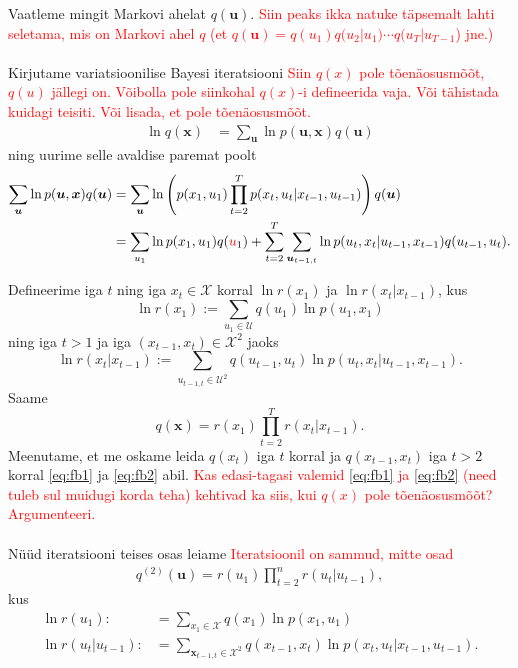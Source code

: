 Vaatleme mingit Markovi ahelat $q(\bm{u})$.
\textcolor{red}{Siin peaks ikka natuke täpsemalt lahti seletama, mis on Markovi ahel $q$ (et $q(\bm{u})=q(u_1)q(u_2|u_1)\cdots q(u_T|u_{T-1}$) jne.)}
\\\\
Kirjutame variatsioonilise Bayesi iteratsiooni \textcolor{red}{Siin $q(x)$ pole tõenäosusmõõt, $q(u)$ jällegi on. Võibolla pole siinkohal $q(x)$-i defineerida vaja. Või tähistada kuidagi teisiti. Või lisada, et pole tõenäosusmõõt.}
\begin{align*}
    \ln q(\bm{x}) &= \sum_{\bm{u}} \ln p(\bm{u},\bm{x}) q(\bm{u})
\end{align*}
ning uurime selle avaldise paremat poolt
\begin{align*}
    \sum_{\bm{u}} \ln p(\bm{u},\bm{x}) q(\bm{u}) &=  \sum_{\bm{u}} \ln \left( p(x_1, u_1) \prod_{t=2}^T p(x_t,u_t | x_{t-1}, u_{t-1}) \right) q(\bm{u}) \\
    &= \sum_{u_1} \ln p(x_1, u_1) q(\textcolor{red}{u}_1)  + \sum_{t=2}^T \sum_{\bm{u}_{t-1,t}} \ln p(u_t,x_t | u_{t-1}, x_{t-1}) q(u_{t-1},u_{t}).
\end{align*}

Defineerime iga $t$ ning iga $x_t \in \mathcal{X}$ korral $\ln r(x_1)$ ja $\ln r(x_t | x_{t-1})$, kus
$$\ln r(x_1) := \sum_{u_1 \in \mathcal{U}}  q(u_1) \ln p(u_1,x_1)$$
ning iga $t > 1$ ja iga $(x_{t-1}, x_t) \in \mathcal{X}^2$ jaoks
$$\ln r(x_{t}|x_{t-1}) := \sum_{u_{t-1,t} \in \mathcal{U}^2}  q(u_{t-1}, u_t) \ln p(u_{t},x_t | u_{t-1},x_{t-1}).$$ Saame
$$q(\bm{x}) = r(x_1)\prod_{t=2}^T r(x_t | x_{t-1}).$$
Meenutame, et me oskame leida $q(x_t)$ iga $t$ korral ja $q(x_{t-1},x_t)$ iga $t>2$ korral \eqref{eq:fb1} ja \eqref{eq:fb2} abil.
\textcolor{red}{Kas edasi-tagasi valemid   \eqref{eq:fb1} ja \eqref{eq:fb2} (need tuleb sul muidugi korda teha)  kehtivad ka siis, kui $q(x)$ pole  tõenäosusmõõt? Argumenteeri.}
\\\\

Nüüd iteratsiooni teises osas leiame \textcolor{red}{Iteratsioonil on sammud, mitte osad}
\begin{align*}
    q^{(2)}(\bm{u}) = r(u_1) \prod_{t=2}^n r(u_t | u_{t-1}),
\end{align*}
kus 
\begin{align*}
    \ln r(u_1) :&= \sum_{x_1 \in \mathcal{X}}  q(x_1) \ln p(x_1,u_1) \\
    \ln r(u_{t}|u_{t-1}) :&= \sum_{\bm{x}_{t-1,t} \in \mathcal{X}^2}  q(x_{t-1}, x_t) \ln p(x_{t},u_t | x_{t-1},u_{t-1}).
\end{align*}

